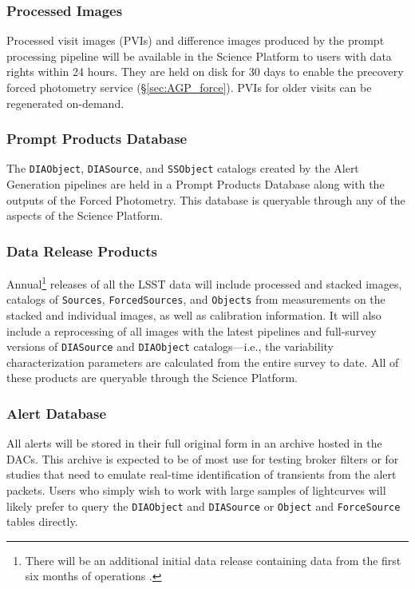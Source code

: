 \subsubsection{Processed Images} \label{sec:products}

Processed visit images (PVIs) and difference images produced by the prompt processing pipeline will be available in the Science Platform to users with data rights within 24 hours.
They are held on disk for 30 days to enable the precovery forced photometry service (\S \ref{sec:AGP_force}).
PVIs for older visits can be regenerated on-demand.

\subsubsection{Prompt Products Database} \label{sec:ppdb}

The \texttt{DIAObject}, \texttt{DIASource}, and \texttt{SSObject} catalogs created by the Alert Generation pipelines are held in a Prompt Products Database along with the outputs of the Forced Photometry.
This database is queryable through any of the aspects of the Science Platform.


\subsubsection{Data Release Products} \label{sec:drp}

Annual\footnote{There will be an additional initial data release containing data from the first six months of operations .}  releases of all the LSST data will include processed and stacked images, catalogs of {\tt Sources}, {\tt ForcedSources}, and {\tt Objects} from measurements on the stacked and individual images, as well as calibration information.
It will also include a  reprocessing of all images with the latest pipelines and full-survey versions of {\tt DIASource} and {\tt DIAObject} catalogs---i.e., the variability characterization parameters are calculated from the entire survey to date.
All of these products are queryable through the Science Platform.

\subsubsection{Alert Database} \label{sec:alertdb}

All alerts will be stored in their full original form in an archive hosted in the DACs.
This archive is expected to be of most use for testing broker filters or for studies that need to emulate real-time identification of transients from the alert packets.
Users who simply wish to work with large samples of lightcurves will likely prefer to query the \texttt{DIAObject} and \texttt{DIASource} or \texttt{Object} and \texttt{ForceSource} tables directly.
